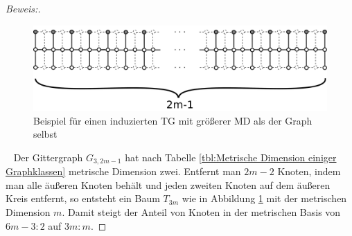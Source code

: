 \begin{proof}[Beweis:]$\;$
\begin{figure}[h!]
		\centering 		 
\includegraphics[width=420pt]{bilder/gitterzubaumlsch.pdf}
   \caption{Beispiel für einen induzierten TG mit größerer MD als der Graph selbst}
   \label{bild:Gitterbaum2}
  	 \end{figure}
~ \linebreak
Der Gittergraph $G_{3,2m-1}$ hat nach Tabelle \ref{tbl:Metrische Dimension einiger Graphklassen} metrische Dimension zwei. Entfernt man $2m-2$ Knoten, indem man alle äußeren Knoten behält und jeden zweiten Knoten auf dem äußeren Kreis entfernt, so entsteht ein Baum $T_{3m}$ wie in Abbildung \ref{bild:Gitterbaum2} mit der metrischen Dimension $m$. Damit steigt der Anteil von Knoten in der metrischen Basis von $6m-3:2$ auf $3m:m$.
\end{proof}

